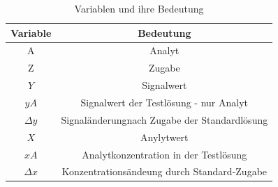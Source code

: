 \renewcommand{\arraystretch}{1.2}
\begin{table}[h!]
	\centering
	\caption{Variablen und ihre Bedeutung}
	\label{tab:variablen}
			\begin{tabular}{c|c}
				\hline
				\textbf{Variable}&\textbf{Bedeutung} \\
				\hline
				A& Analyt \\
				Z& Zugabe\\
				$Y$& Signalwert\\
				$yA$& Signalwert der Testlösung - nur Analyt\\
				$\Delta y$& Signaländerungnach Zugabe der Standardlösung \\
				$X$& Anylytwert\\
				$xA$&Analytkonzentration in der Testlösung\\
				$\Delta x$& Konzentrationsändeung durch Standard-Zugabe \\
				\hline	
			\end{tabular}
		\end{table}
		\FloatBarrier
		\vspace*{-2.5mm}

